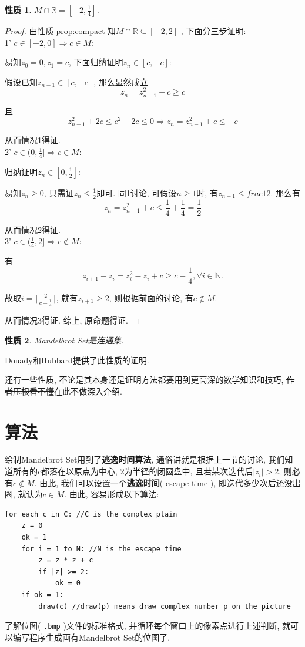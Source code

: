 \documentclass{ctexart}
\newtheorem{property}{性质}
\begin{document}
\begin{property}
$M \cap \mathbb{R} = [-2, \frac{1}{4}]$.
\end{property}
\begin{proof}
由性质\ref{prop:compact}知$M \cap \mathbb{R} \subseteq [-2, 2]$ , 下面分三步证明: \\
1' $c \in [-2, 0] \Rightarrow c \in M$: 
\par 易知$z_0=0, z_1=c$, 下面归纳证明$z_n \in [c, -c]$:
\par 假设已知$z_{n-1} \in [c, -c]$, 那么显然成立
$$z_n = z_{n-1}^2+c \ge c$$
\par 且
$$z_{n-1}^2+2c \le c^2+2c \le 0 \Rightarrow z_n = z_{n-1}^2+c \le -c$$
\par 从而情况1得证. \\
2' $c \in (0, \frac{1}{4}] \Rightarrow c \in M$:
\par 归纳证明$z_n \in [0, \frac{1}{2}]$:
\par 易知$z_n \ge 0$, 只需证$z_n \le \frac{1}{2}$即可. 同1讨论, 可假设$n \ge 1$时, 有$z_{n-1} \le frac{1}{2}$. 那么有
$$z_n=z_{n-1}^2+c \le \frac{1}{4}+\frac{1}{4} = \frac{1}{2}$$
\par 从而情况2得证. \\
3' $c \in (\frac{1}{4}, 2] \Rightarrow c \notin M$:
\par 有
$$z_{i+1}-z_i = z_i^2-z_i+c \ge c-\frac{1}{4}, \forall i \in \mathbb{N}.$$
\par 故取$i=\lceil \frac{2}{c-\frac{1}{4}} \rceil$, 就有$z_{i+1} \ge 2$, 则根据前面的讨论, 有$c \notin M$.
\par 从而情况3得证. 综上, 原命题得证.
\end{proof}

\begin{property}
Mandelbrot Set是连通集.
\end{property}
\par Douady和Hubbard提供了此性质的证明.

\par 还有一些性质, 不论是其本身还是证明方法都要用到更高深的数学知识和技巧, \sout{作者压根看不懂}在此不做深入介绍.

\section{算法}
绘制Mandelbrot Set用到了\textbf{逃逸时间算法}, 通俗讲就是根据上一节的讨论, 我们知道所有的$c$都落在以原点为中心, 2为半径的闭圆盘中, 且若某次迭代后$|z_i| > 2$, 则必有$c \notin M$. 由此, 我们可以设置一个\textbf{逃逸时间}( escape time ), 即迭代多少次后还没出圈, 就认为$c \in M$. 由此, 容易形成以下算法:
\begin{verbatim}
for each c in C: //C is the complex plain
    z = 0
    ok = 1
    for i = 1 to N: //N is the escape time
        z = z * z + c
        if |z| >= 2:
            ok = 0
    if ok = 1:
        draw(c) //draw(p) means draw complex number p on the picture
\end{verbatim}
\par 了解位图( \verb!.bmp! )文件的标准格式, 并循环每个窗口上的像素点进行上述判断, 就可以编写程序生成画有Mandelbrot Set的位图了.
\end{document}
